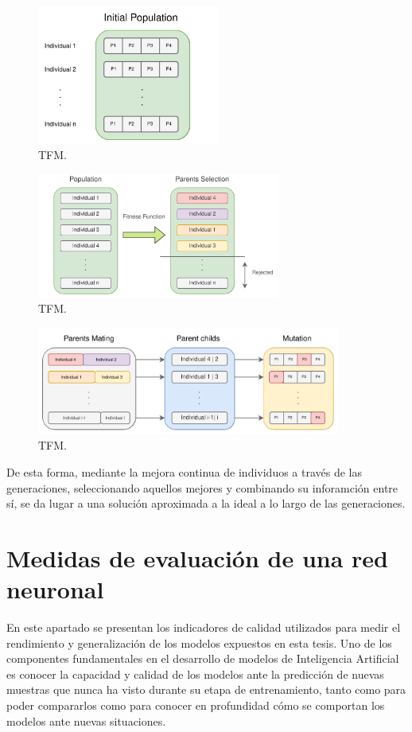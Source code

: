 \documentclass{uathesis-es}
\begin{document}
{	\begin{figure}[H]
		\centering
		\includegraphics[width=6cm]{Figures/GA/inicializacion.png}
		\caption{TFM.}
		\label{GA_inicializacion}
	\end{figure}
	\begin{figure}[H]
		\centering
		\includegraphics[width=8cm]{Figures/GA/selection.png}
		\caption{TFM.}
		\label{GA_selection}
	\end{figure}
	\begin{figure}[H]
		\centering
		\includegraphics[width=10cm]{Figures/GA/cruce_mutacion.png}
		\caption{TFM.}
		\label{GA_cruce_mutacion}
	\end{figure}
	
	De esta forma, mediante la mejora continua de individuos a través de las generaciones, seleccionando aquellos mejores y combinando su inforamción entre sí, se da lugar a una solución aproximada a la ideal a lo largo de las generaciones.
	
	\section{Medidas de evaluación de una red neuronal}
	
	En este apartado se presentan los indicadores de calidad utilizados para medir el rendimiento y generalización de los modelos expuestos en esta tesis. Uno de los componentes fundamentales en el desarrollo de modelos de Inteligencia Artificial es conocer la capacidad y calidad de los modelos ante la predicción de nuevas muestras que nunca ha visto durante su etapa de entrenamiento, tanto como para poder compararlos como para conocer en profundidad cómo se comportan los modelos ante nuevas situaciones.
	
}
\end{document}
